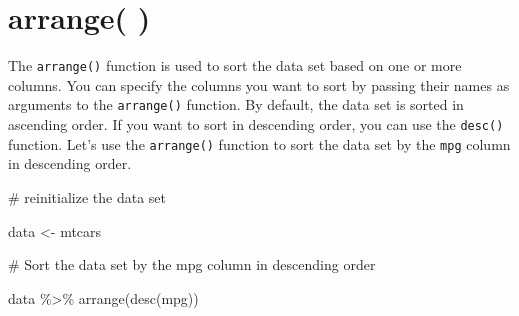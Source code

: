 \documentclass[
  letterpaper,
  DIV=11,
  numbers=noendperiod]{scrreprt}
\newenvironment{Shaded}{\begin{snugshade}}{\end{snugshade}}
\newcommand{\CommentTok}[1]{\textcolor[rgb]{0.37,0.37,0.37}{#1}}
\newcommand{\FunctionTok}[1]{\textcolor[rgb]{0.28,0.35,0.67}{#1}}
\newcommand{\NormalTok}[1]{\textcolor[rgb]{0.00,0.23,0.31}{#1}}
\newcommand{\OtherTok}[1]{\textcolor[rgb]{0.00,0.23,0.31}{#1}}
\newcommand{\SpecialCharTok}[1]{\textcolor[rgb]{0.37,0.37,0.37}{#1}}
\begin{document}
\section*{arrange( )}\label{arrange}


The \texttt{arrange()} function is used to sort the data set based on
one or more columns. You can specify the columns you want to sort by
passing their names as arguments to the \texttt{arrange()} function. By
default, the data set is sorted in ascending order. If you want to sort
in descending order, you can use the \texttt{desc()} function. Let's use
the \texttt{arrange()} function to sort the data set by the \texttt{mpg}
column in descending order.

\begin{Shaded}
\begin{Highlighting}[]
\CommentTok{\# reinitialize the data set}

\NormalTok{data }\OtherTok{\textless{}{-}}\NormalTok{ mtcars}

\CommentTok{\# Sort the data set by the mpg column in descending order}

\NormalTok{data }\SpecialCharTok{\%\textgreater{}\%}
  \FunctionTok{arrange}\NormalTok{(}\FunctionTok{desc}\NormalTok{(mpg))}
\end{Highlighting}
\end{Shaded}
\end{document}
